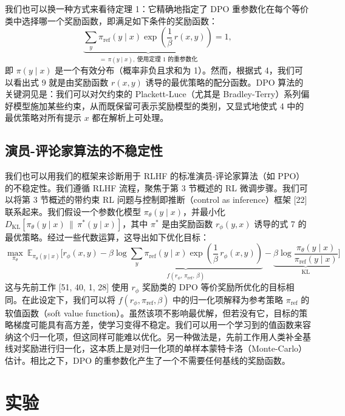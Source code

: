 \documentclass[11pt,UTF8,fontset=fandol]{ctexart}
\newcommand{\KL}{\mathrm{KL}}
\newcommand{\sref}{\mathrm{ref}}
\begin{document}
我们也可以换一种方式来看待定理 1：它精确地指定了 DPO 重参数化在每个等价类中选择哪一个奖励函数，即满足如下条件的奖励函数：
\begin{equation}
\underbrace{\sum_y \pi_\sref(y \mid x) \exp\left(\frac{1}{\beta}\, r(x, y)\right)}_{=\,\pi(y \mid x),\ \text{使用定理 1 的重参数化}} = 1, \tag{9}
\end{equation}
即 $\pi(y \mid x)$ 是一个有效分布（概率非负且求和为 1）。然而，根据式 4，我们可以看出式 9 就是由奖励函数 $r(x, y)$ 诱导的最优策略的配分函数。DPO 算法的关键洞见是：我们可以对欠约束的 Plackett-Luce（尤其是 Bradley-Terry）系列偏好模型施加某些约束，从而既保留可表示奖励模型的类别，又显式地使式 4 中的最优策略对所有提示 $x$ 都在解析上可处理。

\subsection{演员-评论家算法的不稳定性}

我们也可以用我们的框架来诊断用于 RLHF 的标准演员-评论家算法（如 PPO）的不稳定性。我们遵循 RLHF 流程，聚焦于第 3 节概述的 RL 微调步骤。我们可以将第 3 节概述的带约束 RL 问题与控制即推断（control as inference）框架 [22] 联系起来。我们假设一个参数化模型 $\pi_\theta(y \mid x)$，并最小化 $D_{\KL}[\pi_\theta(y \mid x) \,\|\, \pi^*(y \mid x)]$，其中 $\pi^*$ 是由奖励函数 $r_\phi(y, x)$ 诱导的式 7 的最优策略。经过一些代数运算，这导出如下优化目标：
\begin{equation}
\max_{\pi_\theta}\ \mathbb{E}_{\pi_\theta(y \mid x)}\bigg[
r_\phi(x, y) -
\underbrace{\beta \log \sum_y \pi_\sref(y \mid x) \exp\left(\frac{1}{\beta}\, r_\phi(x, y)\right)}_{f(r_\phi,\, \pi_\sref,\, \beta)}
- \underbrace{\beta \log \frac{\pi_\theta(y \mid x)}{\pi_\sref(y \mid x)}}_{\mathrm{KL}}
\bigg] \tag{10}
\end{equation}
这与先前工作 [51, 40, 1, 28] 使用 $r_\phi$ 奖励类的 DPO 等价奖励所优化的目标相同。在此设定下，我们可以将 $f(r_\phi, \pi_\sref, \beta)$ 中的归一化项解释为参考策略 $\pi_\sref$ 的软值函数（soft value function）。虽然该项不影响最优解，但若没有它，目标的策略梯度可能具有高方差，使学习变得不稳定。我们可以用一个学习到的值函数来容纳这个归一化项，但这同样可能难以优化。另一种做法是，先前工作用人类补全基线对奖励进行归一化，这本质上是对归一化项的单样本蒙特卡洛（Monte-Carlo）估计。相比之下，DPO 的重参数化产生了一个不需要任何基线的奖励函数。

\section{实验}
\end{document}
